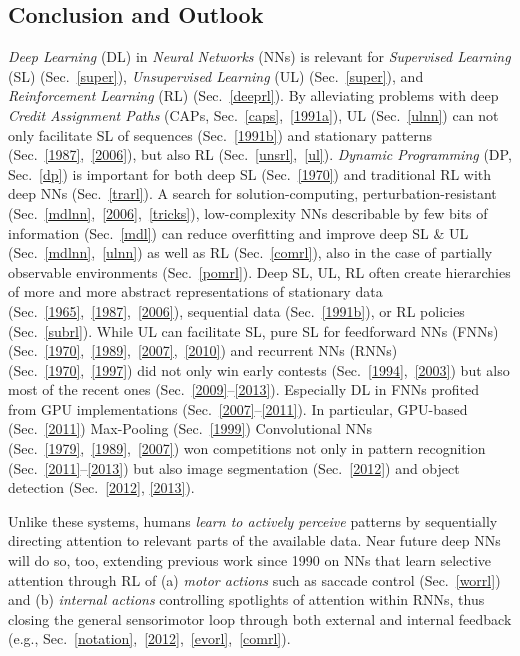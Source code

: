 \documentclass[letterpaper]{article}
\begin{document}
\begin{CJK*}{UTF8}{gbsn}


\section{Conclusion and Outlook}
\label{outlook}

{\em Deep Learning} (DL) in 
{\em Neural Networks} (NNs)
is relevant for
{\em Supervised Learning} (SL) (Sec.~\ref{super}),
{\em Unsupervised Learning} (UL) (Sec.~\ref{super}), and
{\em Reinforcement Learning} (RL) (Sec.~\ref{deeprl}).
By alleviating problems with deep {\em Credit Assignment Paths} (CAPs, Sec.~\ref{caps},~\ref{1991a}),
UL (Sec.~\ref{ulnn}) can not only facilitate 
SL of sequences  
(Sec.~\ref{1991b}) and 
stationary patterns
(Sec.~\ref{1987},~\ref{2006}), but also 
RL (Sec.~\ref{unsrl},~\ref{ul}). 
{\em Dynamic Programming} (DP, Sec.~\ref{dp}) is important for both 
deep SL (Sec.~\ref{1970})
and traditional RL with deep NNs (Sec.~\ref{trarl}).
A search for solution-computing, 
perturbation-resistant (Sec.~\ref{mdlnn},~\ref{2006},~\ref{tricks}),
low-complexity  NNs 
describable by few bits of information (Sec.~\ref{mdl}) can 
reduce overfitting and 
improve
deep SL \& UL (Sec.~\ref{mdlnn},~\ref{ulnn}) as well as RL (Sec.~\ref{comrl}),
also in the case of partially observable environments (Sec.~\ref{pomrl}). 
Deep SL, UL, RL often create hierarchies of more and more abstract  
representations of stationary data (Sec.~\ref{1965},~\ref{1987},~\ref{2006}),
sequential data (Sec.~\ref{1991b}), or RL policies (Sec.~\ref{subrl}). 
While UL can facilitate SL, pure SL for feedforward NNs (FNNs) (Sec.~\ref{1970},~\ref{1989},~\ref{2007},~\ref{2010})
and recurrent NNs (RNNs) (Sec.~\ref{1970},~\ref{1997})
did not only win early contests (Sec.~\ref{1994},~\ref{2003}) but also
most of the recent ones   
(Sec.~\ref{2009}--\ref{2013}).
Especially DL in FNNs profited from 
GPU implementations (Sec.~\ref{2007}--\ref{2011}).
In particular, 
GPU-based (Sec.~\ref{2011}) Max-Pooling (Sec.~\ref{1999}) Convolutional NNs (Sec.~\ref{1979},~\ref{1989},~\ref{2007})
won competitions not only in pattern recognition (Sec.~\ref{2011}--\ref{2013}) 
but also
image segmentation (Sec.~\ref{2012})
and object detection (Sec.~\ref{2012}, \ref{2013}).

Unlike these systems, humans {\em learn to actively perceive} patterns by sequentially directing attention to relevant parts of the available data. Near future deep NNs will do so, too, extending previous work since 1990 on NNs that learn selective attention through RL of (a) {\em motor actions} such as saccade control (Sec.~\ref{worrl}) and (b)  {\em internal actions} controlling spotlights of attention within RNNs, thus closing the general sensorimotor loop through both external and internal feedback (e.g., Sec.~\ref{notation},~\ref{2012},~\ref{evorl},~\ref{comrl}).


\end{CJK*}
\end{document}
